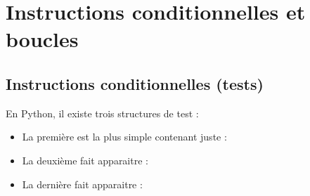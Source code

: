 \documentclass[letterpaper,10pt,french]{sphinxmanual}
\begin{document}
\section{Instructions conditionnelles et boucles}
\label{\detokenize{ch2:instructions-conditionnelles-et-boucles}}\label{\detokenize{ch2::doc}}

\subsection{Instructions conditionnelles (tests)}
\label{\detokenize{ch2:instructions-conditionnelles-tests}}
\sphinxAtStartPar
En Python, il existe trois structures de test :
\begin{itemize}
\item {} 
\sphinxAtStartPar
La première est la plus simple contenant juste  :

\end{itemize}

\begin{sphinxVerbatim}[commandchars=\\\{\}]
 
\end{sphinxVerbatim}
\begin{itemize}
\item {} 
\sphinxAtStartPar
La deuxième fait apparaitre  :

\end{itemize}

\begin{sphinxVerbatim}[commandchars=\\\{\}]
 
\end{sphinxVerbatim}
\begin{itemize}
\item {} 
\sphinxAtStartPar
La dernière fait apparaitre  :

\end{itemize}

\begin{sphinxVerbatim}[commandchars=\\\{\}]
 
     
 
     
 
     
 
     
     
\end{sphinxVerbatim}
\end{document}
